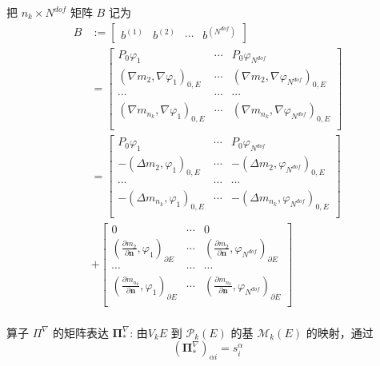 把 $n_k \times N^{dof}$ 矩阵 $B$ 记为 \\
\begin{equation}
\begin{aligned}
B &:= \begin{bmatrix}
b^{(1)} & b^{(2)} & \cdots & b^{(N^{dof})}
\end{bmatrix} \\
& = \begin{bmatrix}
P_0\varphi_1 & \cdots & P_0\varphi_{N^{dof}}\\
(\nabla m_2, \nabla\varphi_1)_{0, E} & \cdots & (\nabla m_2, \nabla\varphi_{N^{dof}})_{0, E}\\
\cdots & \cdots & \cdots \\
(\nabla m_{n_k}, \nabla\varphi_1)_{0, E} & \cdots & (\nabla m_{n_k}, \nabla\varphi_{N^{dof}})_{0, E}\\
\end{bmatrix}\\
& = \begin{bmatrix}
P_0\varphi_1 & \cdots & P_0\varphi_{N^{dof}}\\
-(\Delta m_2,\varphi_1)_{0, E} & \cdots & -(\Delta m_2,\varphi_{N^{dof}})_{0, E}\\
\cdots & \cdots & \cdots \\
-(\Delta m_{n_k}, \varphi_1)_{0, E} & \cdots & -(\Delta m_{n_k},\varphi_{N^{dof}})_{0, E}\\
\end{bmatrix}\\
& +\begin{bmatrix}
0 & \cdots & 0\\
(\frac{ \partial m_2}{\partial \mathbf n},\varphi_1)_{\partial E} & \cdots & (\frac{\partial m_2}{\partial \mathbf n},\varphi_{N^{dof}})_{\partial E}\\
\cdots & \cdots & \cdots \\
(\frac{\partial m_{n_k}}{\partial \mathbf n}, \varphi_1)_{\partial E} & \cdots & (\frac{\partial m_{n_k}}{\partial \mathbf n}, \varphi_{N^{dof}})_{\partial E}\\
\end{bmatrix}\\
\end{aligned}
\end{equation}

算子 $\Pi^{\nabla}$ 的矩阵表达 $\boldsymbol{\Pi}_{\ast}^{\nabla}$: 由$V_k{E}$ 到 $\mathcal{P}_k(E)$ 的基 $\mathcal{M}_k(E)$ 的映射，通过 \\
\begin{equation*}
(\boldsymbol{\Pi}_{\ast}^{\nabla})_{\alpha i} = s_i^{\alpha}
\end{equation*}

